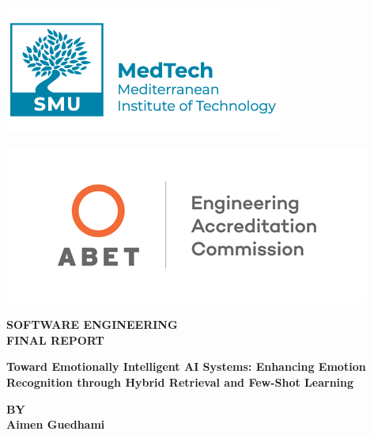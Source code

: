 \begin{titlepage}
\centering

\vspace*{-2cm}

\begin{minipage}{0.45\textwidth}
    \centering
    \includegraphics[width=0.8\linewidth]{Images/Medtech.png}
\end{minipage}%
\hfill
\begin{minipage}{0.45\textwidth}
    \centering
    \includegraphics[width=0.6\linewidth]{Images/abet.png}
\end{minipage}

\vspace{1.5cm}

{\fontsize{14pt}{16pt}\selectfont\textbf{SOFTWARE ENGINEERING}}\\[0.2cm]
{\fontsize{14pt}{16pt}\selectfont\textbf{FINAL REPORT}}\\[1.5cm]

\begin{minipage}{0.9\textwidth}
\centering
{\fontsize{14pt}{16pt}\selectfont\textbf{
Toward Emotionally Intelligent AI Systems: Enhancing Emotion Recognition through Hybrid Retrieval and Few-Shot Learning}}
\end{minipage}

\vspace{2cm}

{\fontsize{12pt}{14pt}\selectfont\textbf{BY}}\\
{\fontsize{12pt}{14pt}\selectfont\textbf{Aimen Guedhami}}\\[1.5cm]


\end{titlepage}
